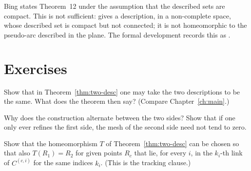 
\begin{remark}
Bing states Theorem~12 under the assumption that the described sets are compact. This is not sufficient:  gives a
description, in a non-complete space, whose described set is compact but not connected; it is not homeomorphic to the
pseudo-arc described in the plane. The formal development records this as .
\end{remark}

\section*{Exercises}

\begin{exercise}
Show that in Theorem~\ref{thm:two-desc} one may take the two descriptions to be the same. What does the theorem then say?
(Compare Chapter~\ref{ch:main}.)
\end{exercise}

\begin{exercise}
Why does the construction alternate between the two sides? Show that if one only ever refines the first side, the
mesh of the second side need not tend to zero.
\end{exercise}

\begin{exercise}
Show that the homeomorphism $T$ of Theorem~\ref{thm:two-desc} can be chosen so that also $T(R_1)=R_2$ for given points $R_c$ that
lie, for every $i$, in the $k_i$-th link of $C^{(c,i)}$ for the same indices $k_i$. (This is the tracking clause.)
\end{exercise}
